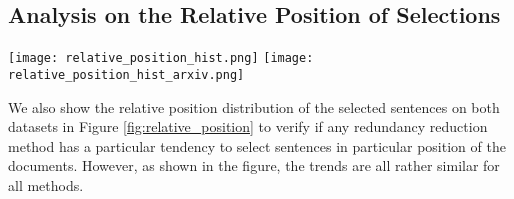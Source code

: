 \documentclass[11pt,a4paper]{article}
\begin{document}
\subsection{Analysis on the Relative Position of Selections}
\begin{figure*}[h!]
    \centering
    \texttt{[image: relative\_position\_hist.png]}
    \texttt{[image: relative\_position\_hist\_arxiv.png]}
    \caption{The relative position distribution of different redundancy reduction methods on Pubmed(left) and arXiv(right) datasets.}
    \label{fig:relative_position}
\end{figure*}
We also show the relative position distribution of the selected sentences on both datasets in Figure \ref{fig:relative_position} to verify if any redundancy reduction method has a particular  tendency to select sentences in particular position of the documents. However, as shown in the figure, the trends are all rather similar for all methods.
\end{document}
